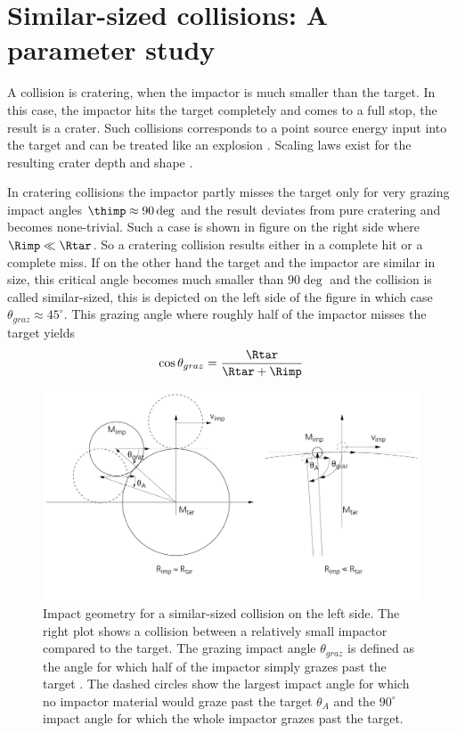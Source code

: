 \newpage
\chapter{Similar-sized collisions: A parameter study}
\label{ch03}
\graphicspath{{./03figs/}}

A collision is cratering, when the impactor is much smaller than the target. In this case, the impactor hits the target completely and comes to a full stop, the result is a crater. Such collisions corresponds to a point source energy input into the target and can be treated like an explosion \citep{Melosh:2007p3502}. Scaling laws exist for the resulting crater depth and shape \citep{Holsapple:1993p3018}. 

In cratering collisions the impactor partly misses the target only for very grazing impact angles $\thimp \approx 90 \deg$ and the result deviates from pure cratering and becomes none-trivial. Such a case is shown in figure \label{ch03_fig03} on the right side where $\Rimp \ll \Rtar$. So a cratering collision results either in a complete hit or a complete miss. If on the other hand the target and the impactor are similar in size, this critical angle becomes much smaller than $90 \deg$ and the collision is called similar-sized, this is depicted on the left side of the figure in which case $\theta_{graz} \approx 45^\circ$. This grazing angle where roughly half of the impactor misses the target yields
\begin{equation}
\label{ch03_eq001}
\cos{ \theta_{graz} }= \frac{\Rtar}{\Rtar + \Rimp}
\end{equation}

\begin{figure}
\begin{center}
\includegraphics[scale=0.4]{03_grazing}
\caption{Impact geometry for a similar-sized collision on the left side. The right plot shows a collision between a relatively small impactor compared to the target. The grazing impact angle $\theta_{graz}$ is defined as the angle for which half of the impactor simply grazes past the target \citep{Asphaug:2010p3539}. The dashed circles show the largest impact angle for which no impactor material would graze past the target $\theta_A$ and the $90^\circ$ impact angle for which the whole impactor grazes past the target.}
\label{ch03_fig03}
\end{center}
\end{figure}


